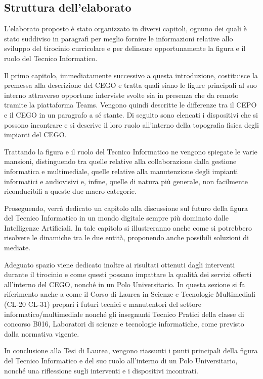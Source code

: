     \subsection*{Struttura dell'elaborato}
        \par
            L'elaborato proposto è stato organizzato in diversi capitoli, ognuno dei quali è stato suddiviso in paragrafi per meglio fornire le informazioni relative allo sviluppo del tirocinio curricolare e per delineare opportunamente la figura e il ruolo del Tecnico Informatico. 
        \par
            Il primo capitolo, immediatamente successivo a questa introduzione, costituisce la premessa alla descrizione del CEGO e tratta quali siano le figure principali al suo interno attraverso opportune interviste svolte sia in presenza che da remoto tramite la piattaforma Teams. Vengono quindi descritte le differenze tra il CEPO e il CEGO in un paragrafo a sé stante. \newline
            Di seguito sono elencati i dispositivi che si possono incontrare e si descrive il loro ruolo all'interno della topografia fisica degli impianti del CEGO. 
        \par
            Trattando la figura e il ruolo del Tecnico Informatico ne vengono spiegate le varie mansioni, distinguendo tra quelle relative alla collaborazione dalla gestione informatica e multimediale, quelle relative alla manutenzione degli impianti informatici e audiovisivi e, infine, quelle di natura più generale, non facilmente riconducibili a queste due macro categorie.
        \par
            Proseguendo, verrà dedicato un capitolo alla discussione sul futuro della figura del Tecnico Informatico in un mondo digitale sempre più dominato dalle Intelligenze Artificiali. In tale capitolo si illustreranno anche come si potrebbero risolvere le dinamiche tra le due entità, proponendo anche possibili soluzioni di mediate. 
        \par
            Adeguato spazio viene dedicato inoltre ai risultati ottenuti dagli interventi durante il tirocinio e come questi possano impattare la qualità dei servizi offerti all'interno del CEGO, nonché in un Polo Universitario.
            In questa sezione si fa riferimento anche a come il Corso di Laurea in Scienze e Tecnologie Multimediali (CL-20 CL-31) prepari i futuri tecnici e manutentori del settore informatico/multimediale nonché gli insegnanti Tecnico Pratici della classe di concorso B016, Laboratori di scienze e tecnologie informatiche, come previsto dalla normativa vigente.
        \par
            In conclusione alla Tesi di Laurea, vengono riassunti i punti principali della figura del Tecnico Informatico e del suo ruolo all'interno di un Polo Universitario, nonché una riflessione sugli interventi e i dispositivi incontrati.
